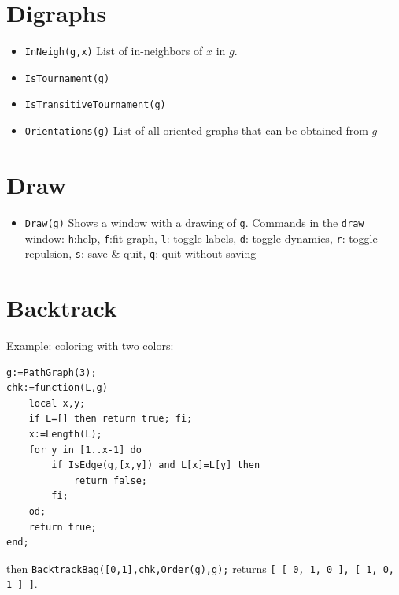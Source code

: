 \documentclass[11pt]{article}
\begin{document}
\begin{multicols}{3}
\section{Digraphs}
\label{sec:org972a7a3}

\begin{itemize}
\item \texttt{InNeigh(g,x)} List of in-neighbors of \(x\) in \(g\).
\item \texttt{IsTournament(g)}
\item \texttt{IsTransitiveTournament(g)}
\item \texttt{Orientations(g)} List of all oriented graphs that can be obtained
from \(g\)
\end{itemize}

\section{Draw}
\label{sec:org84111ef}
\begin{itemize}
\item \texttt{Draw(g)} Shows a window with a drawing of \texttt{g}. Commands in the \texttt{draw} window: \texttt{h}:help, \texttt{f}:fit graph,
\texttt{l}: toggle labels, \texttt{d}: toggle dynamics, \texttt{r}: toggle repulsion, \texttt{s}: save \& quit, \texttt{q}:
quit without saving
\end{itemize}

\section{Backtrack}
\label{sec:org809335c}

Example: coloring with two colors:
\begin{lstlisting}
g:=PathGraph(3);
chk:=function(L,g)
    local x,y;
    if L=[] then return true; fi;
    x:=Length(L);
    for y in [1..x-1] do
        if IsEdge(g,[x,y]) and L[x]=L[y] then
            return false;
        fi;
    od;
    return true;
end;
\end{lstlisting}
then \texttt{BacktrackBag([0,1],chk,Order(g),g);} returns \texttt{[ [ 0, 1, 0 ], [
  1, 0, 1 ] ]}. 


\end{multicols}
\end{document}
